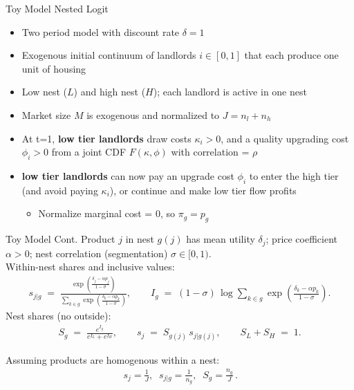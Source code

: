 \documentclass[10pt, xcolor=dvipsnames]{beamer}
\begin{document}
\begin{frame}{Toy Model Nested Logit}
    \begin{itemize}
        \item Two period model with discount rate $\delta =1$
        \item Exogenous initial continuum of landlords $i \in [0,1]$ that each produce one unit of housing
        \item Low nest ($L$) and high nest ($H$); each landlord is active in one nest
        \item Market size $M$ is exogenous and normalized to $J=n_l +n_h$
        \item At t=1, \textbf{low tier landlords} draw costs $\kappa_i>0$, and a quality upgrading cost $\phi_i>0$ from a joint CDF $F(\kappa,\phi)$ with correlation = $\rho$
        \item \textbf{low tier landlords} can now pay an upgrade cost $\phi_i$ to enter the high tier (and avoid paying $\kappa_i$), or continue and make low tier flow profits
        \begin{itemize}
            \item Normalize marginal cost = 0, so $\pi_g=p_g$
        \end{itemize}
    \end{itemize}    
\end{frame}

\begin{frame}{Toy Model Cont.}
    Product $j$ in nest $g(j)$ has mean utility $\delta_j$; price coefficient $\alpha>0$; nest correlation (segmentation) $\sigma\in[0,1)$. \\
    
    Within-nest shares and inclusive values:
        \begin{align*}
            s_{j|g} \;=\;
            \frac{\exp\!\left(\frac{\delta_j-\alpha p_j}{1-\sigma}\right)}
            {\sum_{k\in g}\exp\!\left(\frac{\delta_k-\alpha p_k}{1-\sigma}\right)},
            \qquad
            I_g \;=\; (1-\sigma)\,\log\!\sum_{k\in g}\exp\!\left(\frac{\delta_k-\alpha p_k}{1-\sigma}\right).
        \end{align*}
    Nest shares (no outside):
        \begin{align*}
            S_g \;=\;\frac{e^{I_g}}{e^{I_L}+e^{I_H}},
            \qquad
            s_j \;=\; S_{g(j)}\,s_{j|g(j)},
            \qquad
            S_L+S_H \;=\; 1.
        \end{align*}
    
    Assuming products are homogenous within a nest: 
        \begin{align*}
            \boxed{\,s_j=\tfrac{1}{J},\;\; s_{j|g}=\tfrac{1}{n_g},\;\; S_g=\tfrac{n_g}{J}\,}.
        \end{align*}
    
\end{frame}
\end{document}
